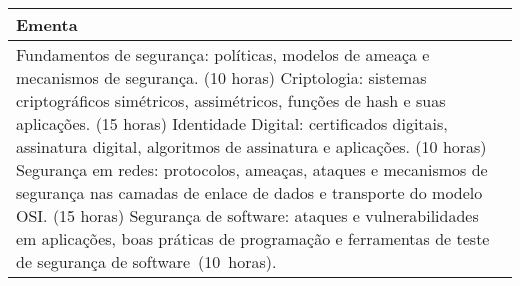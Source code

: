\begin{quadro}[ht!]
\begin{tabular}{|p{3cm} p{2cm} p{3cm} p{2cm} p{3cm} p{2cm}|}
\multicolumn{6}{|p{15cm}|}{\cellcolor{blue1} Ementa} \\\hline
\hline\multicolumn{6}{|p{15cm}|}{\scriptsize Fundamentos de segurança: políticas, modelos de ameaça e mecanismos de segurança. (10 horas) Criptologia: sistemas criptográficos simétricos, assimétricos, funções de hash e suas aplicações. (15 horas) Identidade Digital: certificados digitais, assinatura digital, algoritmos de assinatura e aplicações. (10 horas) Segurança em redes: protocolos, ameaças, ataques e mecanismos de segurança nas camadas de enlace de dados e transporte do modelo OSI. (15 horas) Segurança de software: ataques e vulnerabilidades em aplicações, boas práticas de programação e ferramentas de teste de segurança de software (10 horas).}\\\hline 
\hline
	\end{tabular}
\end{quadro}


